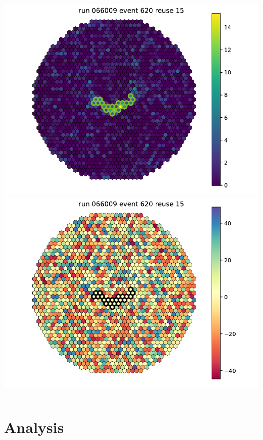\begin{withoutheadline}
\begin{frame}{}
\begin{columns}[onlytextwidth]
\begin{column}{0.33\textwidth}
        \includegraphics[width=\textwidth, page=10]{fig/camera_images/cleaning_facttools_pe_066009.pdf}
        \includegraphics[width=\textwidth, page=10]{fig/camera_images/cleaning_facttools_arrival_times_066009.pdf}
      \end{column}
    \end{columns}
  \end{frame}
\end{withoutheadline}

\section{Analysis}

